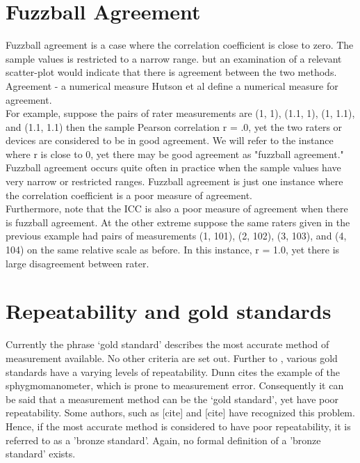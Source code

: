 \documentclass[12pt, a4paper]{report}
\theoremstyle{plain}
\theoremstyle{definition}
\theoremstyle{remark}
\begin{document}
\newpage	\section{Fuzzball Agreement}
	Fuzzball agreement is a case where the correlation coefficient is close to zero. The sample values is restricted to a narrow range. but an examination of a relevant scatter-plot would indicate that
	there is agreement between the two methods.
	\\
	Agreement - a numerical measure Hutson et al define a numerical measure for agreement.
	\\
	For example, suppose the pairs of rater measurements are (1, 1), (1.1, 1), (1, 1.1), and (1.1, 1.1) then the sample Pearson correlation r = .0, yet the two raters or devices are considered to be in good agreement. We will refer to the instance where r is close to 0, yet there may be good agreement as "fuzzball agreement." \\Fuzzball agreement occurs quite often in practice when the sample values have very narrow or restricted ranges. Fuzzball agreement is just one instance where the correlation coefficient is a poor measure of agreement. \\Furthermore, note that the ICC is also a poor measure of agreement when there is fuzzball agreement. At the other extreme suppose the same raters given in the previous example had pairs of measurements (1, 101), (2, 102), (3, 103), and (4, 104) on the same relative scale as before. In this instance, r = 1.0, yet there is large disagreement between rater.
	

	\bigskip
\section{Repeatability and gold standards}
	Currently the phrase `gold standard' describes the most accurate method of measurement available. No other criteria are set out. Further to \citet{dunnSEME}, various gold standards have a varying levels of repeatability. Dunn cites the example of the sphygmomanometer, which is prone to measurement error. Consequently it can be said that a measurement method can be the `gold standard', yet have poor repeatability. Some authors, such as [cite] and [cite] have recognized this problem. Hence, if the most accurate method is considered to have poor repeatability, it is referred to as a 'bronze standard'.  Again, no formal definition of a 'bronze standard' exists.
	
\end{document}
